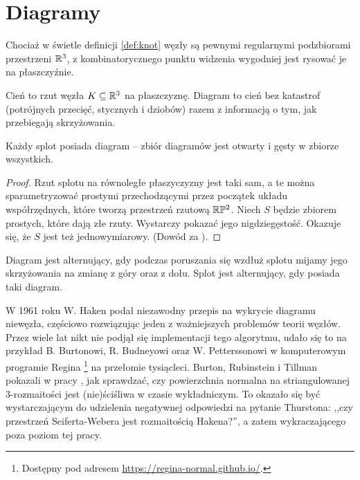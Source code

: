 \section{Diagramy}
Chociaż w świetle definicji \ref{def:knot} węzły są pewnymi regularnymi podzbiorami przestrzeni $\mathbb R^3$,
z kombinatorycznego punktu widzenia wygodniej jest rysować je na  płaszczyźnie.

\begin{definition} \label{def_diagrams}
	Cień to rzut węzła $K \subseteq \mathbb R^3$ na płaszczyznę.
	Diagram to cień bez katastrof
	(potrójnych przecięć, stycznych i dziobów)
	razem z informacją o tym, jak przebiegają skrzyżowania.
\end{definition}

\begin{proposition}
	Każdy splot posiada diagram -- zbiór diagramów jest otwarty i gęsty w zbiorze wszystkich.
\end{proposition}

\begin{proof}
	Rzut splotu na równoległe płaszyczyzny jest taki sam,
	a te można sparametryzować prostymi przechodzącymi przez początek układu współrzędnych,
	które tworzą przestrzeń rzutową $\mathbb R \mathbb P^2$.
	Niech $S$ będzie zbiorem prostych, które dają złe rzuty.
	Wystarczy pokazać jego nigdziegęstość.
	Okazuje się, że $S$ jest też jednowymiarowy.
	(Dowód za \cite{crowell63}).
\end{proof}

\begin{definition}
	Diagram jest alternujący,
	gdy podczas poruszania się wzdłuż splotu
	mijamy jego skrzyżowania na zmianę z góry oraz z dołu.
	Splot jest alternujący, gdy posiada taki diagram.
\end{definition}


W 1961 roku W. Haken \cite{haken61} podał niezawodny przepis na wykrycie diagramu niewęzła,
częściowo rozwiązując jeden z ważniejszych problemów teorii węzłów.
Przez wiele lat nikt nie podjął się implementacji tego algorytmu,
udało się to na przykład B. Burtonowi, R. Budneyowi oraz W. Petterssonowi w komputerowym programie Regina
\footnote{Dostępny pod adresem \url{https://regina-normal.github.io/}.} na przełomie tysiącleci.
Burton, Rubinstein i Tillman pokazali w pracy \cite{burton12}, jak sprawdzać,
czy powierzchnia normalna na striangulowanej 3-rozmaitości jest (nie)ściśliwa w czasie wykładniczym.
To okazało się być wystarczającym do udzielenia negatywnej odpowiedzi na pytanie Thurstona:
,,czy przestrzeń Seiferta-Webera jest rozmaitością Hakena?'',
a zatem wykraczającego poza poziom tej pracy.


